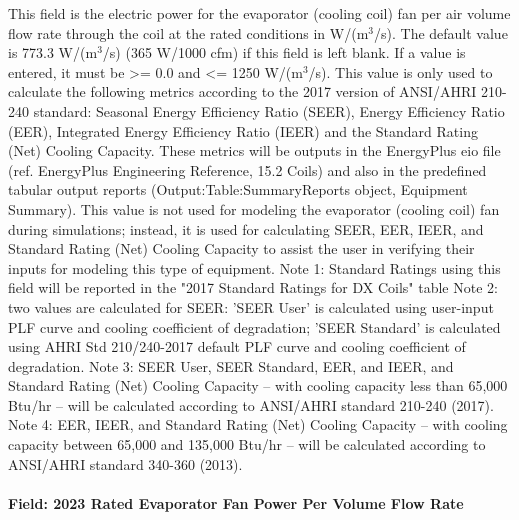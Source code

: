 This field is the electric power for the evaporator (cooling coil) fan per air volume flow rate through the coil at the rated conditions in W/(m\(^{3}\)/s). The default value is 773.3 W/(m\(^{3}\)/s) (365 W/1000 cfm) if this field is left blank. If a value is entered, it must be \textgreater{}= 0.0 and \textless{}= 1250 W/(m\(^{3}\)/s). This value is only used to calculate the following metrics according to the 2017 version of ANSI/AHRI 210-240 standard: Seasonal Energy Efficiency Ratio (SEER), Energy Efficiency Ratio (EER), Integrated Energy Efficiency Ratio (IEER) and the Standard Rating (Net) Cooling Capacity.  These metrics will be outputs in the EnergyPlus eio file (ref. EnergyPlus Engineering Reference, 15.2 Coils) and also in the predefined tabular output reports (Output:Table:SummaryReports object, Equipment Summary). This value is not used for modeling the evaporator (cooling coil) fan during simulations; instead, it is used for calculating SEER, EER, IEER, and Standard Rating (Net) Cooling Capacity to assist the user in verifying their inputs for modeling this type of equipment. 
Note 1: Standard Ratings using this field will be reported in the "2017 Standard Ratings for DX Coils" table
Note 2: two values are calculated for SEER: 'SEER User' is calculated using user-input PLF curve and cooling coefficient of degradation; 'SEER Standard' is calculated using AHRI Std 210/240-2017 default PLF curve and cooling coefficient of degradation.
Note 3: SEER User, SEER Standard, EER, and IEER, and Standard Rating (Net) Cooling Capacity -- with cooling capacity less than 65,000 Btu/hr -- will be calculated according to ANSI/AHRI standard 210-240 (2017).
Note 4: EER, IEER, and Standard Rating (Net) Cooling Capacity -- with cooling capacity between 65,000 and 135,000 Btu/hr -- will be calculated according to ANSI/AHRI standard 340-360 (2013).

\paragraph{Field: 2023 Rated Evaporator Fan Power Per Volume Flow Rate}

